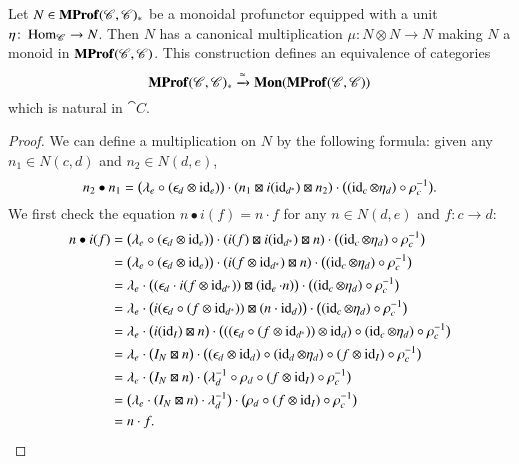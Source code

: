 \documentclass[12pt,oneside,article,draft]{memoir}
\begin{document}
\begin{enumerate}
\begin{proposition}\label{Prop:unit implies monoid}
	Let $N\in\mathbf{MProf}(\mathscr{C},\mathscr{C})_*$ be a monoidal profunctor equipped with a unit $\eta\colon\operatorname{Hom}_{\mathscr{C}}\to N$.
	Then $N$ has a canonical multiplication $\mu\colon N\otimes N\to N$ making $N$ a monoid in $\mathbf{MProf}(\mathscr{C},\mathscr{C})$.
	This construction defines an equivalence of categories
		\[\mathbf{MProf}(\mathscr{C},\mathscr{C})_*\xrightarrow{\simeq}\mathbf{Mon}(\mathbf{MProf}(\mathscr{C},\mathscr{C}))\]
	which is natural in $\cat{C}$.
\end{proposition}
\begin{proof}
	We can define a multiplication on $N$ by the following formula: given any $n_1\in N(c,d)$ and $n_2\in N(d,e)$,
	\[
		n_2\bullet n_1 = \bigl(\lambda_e\circ(\epsilon_d\otimes\operatorname{id}_e)\bigr)\cdot(n_1\boxtimes i(\operatorname{id}_{d^*})\boxtimes n_2)\cdot\bigl((\operatorname{id}_c\otimes \eta_d)\circ\rho_c^{-1}\bigr).
	\]
	We first check the equation $n\bullet i(f)=n\cdot f$ for any $n\in N(d,e)$ and $f\colon c\to d$:
	\begin{align*}
		n\bullet i(f) &= \bigl(\lambda_e\circ(\epsilon_d\otimes\operatorname{id}_e)\bigr)\cdot(i(f)\boxtimes i(\operatorname{id}_{d^*})\boxtimes n)\cdot\bigl((\operatorname{id}_c\otimes \eta_d)\circ\rho_c^{-1}\bigr) \\
		&= \bigl(\lambda_e\circ(\epsilon_d\otimes\operatorname{id}_e)\bigr)\cdot(i(f\otimes\operatorname{id}_{d^*})\boxtimes n)\cdot\bigl((\operatorname{id}_c\otimes \eta_d)\circ\rho_c^{-1}\bigr) \\
		&= \lambda_e\cdot\bigl((\epsilon_d\cdot i(f\otimes \operatorname{id}_{d^*}))\boxtimes (\operatorname{id}_e\cdot n)\bigr)\cdot\bigl((\operatorname{id}_c\otimes \eta_d)\circ\rho_c^{-1}\bigr) \\
		&= \lambda_e\cdot\bigl(i(\epsilon_d\circ (f\otimes \operatorname{id}_{d^*}))\boxtimes (n\cdot\operatorname{id}_d)\bigr)\cdot\bigl((\operatorname{id}_c\otimes \eta_d)\circ\rho_c^{-1}\bigr) \\
		&= \lambda_e\cdot\bigl(i(\operatorname{id}_I)\boxtimes n\bigr)\cdot\bigl(((\epsilon_d\circ (f\otimes \operatorname{id}_{d^*}))\otimes\operatorname{id}_d)\circ(\operatorname{id}_c\otimes \eta_d)\circ\rho_c^{-1}\bigr) \\
		&= \lambda_e\cdot\bigl(I_N\boxtimes n\bigr)\cdot\bigl((\epsilon_d\otimes\operatorname{id}_d)\circ(\operatorname{id}_d\otimes\eta_d)\circ(f\otimes\operatorname{id}_I)\circ\rho_c^{-1}\bigr) \\
		&= \lambda_e\cdot\bigl(I_N\boxtimes n\bigr)\cdot\bigl(\lambda_d^{-1}\circ\rho_d\circ(f\otimes\operatorname{id}_I)\circ\rho_c^{-1}\bigr) \\
		&= \bigl(\lambda_e\cdot(I_N\boxtimes n)\cdot\lambda_d^{-1}\bigr)\cdot\bigl(\rho_d\circ(f\otimes\operatorname{id}_I)\circ\rho_c^{-1}\bigr) \\
		&= n\cdot f.
	\end{align*}


\end{proof}
\end{enumerate}
\end{document}
